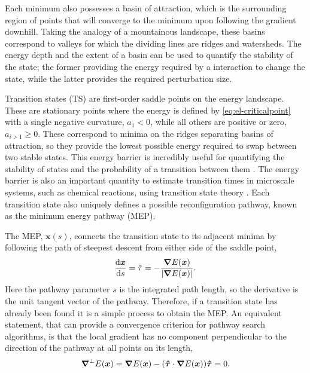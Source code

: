 Each minimum also possesses a basin of attraction, which is the surrounding region of points that will converge to the minimum upon following the gradient downhill.
Taking the analogy of a mountainous landscape, these basins correspond to valleys for which the dividing lines are ridges and watersheds.
The energy depth and the extent of a basin can be used to quantify the stability of the state; the former providing the energy required by a interaction to change the state, while the latter provides the required perturbation size.

Transition states (TS) are first-order saddle points on the energy landscape.
These are stationary points where the energy is defined by \cref{eq:el-criticalpoint} with a single negative curvature, $a_1 < 0$, while all others are positive or zero, $a_{i>1} \ge 0$.
These correspond to minima on the ridges separating basins of attraction, so they provide the lowest possible energy required to swap between two stable states.
This energy barrier is incredibly useful for quantifying the stability of states and the probability of a transition between them \cite{Mokkonen2016}.
The energy barrier is also an important quantity to estimate transition times in microscale systems, such as chemical reactions, using transition state theory \cite{Truhlar1996}.
Each transition state also uniquely defines a possible reconfiguration pathway, known as the minimum energy pathway (MEP).

The MEP, $\bm{x}(s)$, connects the transition state to its adjacent minima by following the path of steepest descent from either side of the saddle point,
\begin{equation}
  \frac{\mathrm{d} \bm{x}}{\mathrm{d} s} = \hat{\tau} = - \frac{\bm{\nabla} E(\bm{x})} {|\bm{\nabla} E(\bm{x})|}.
\end{equation}
Here the pathway parameter $s$ is the integrated path length, so the derivative is the unit tangent vector of the pathway.
Therefore, if a transition state has already been found it is a simple process to obtain the MEP.
An equivalent statement, that can provide a convergence criterion for pathway search algorithms, is that the local gradient has no component perpendicular to the direction of the pathway at all points on its length,
\begin{equation}
  \bm{\nabla}^\perp E(\bm{x}) = \bm{\nabla} E(\bm{x}) - (\bm{\hat{\tau}} \cdot \bm{\nabla} E(\bm{x})) \bm{\hat{\tau}} = 0.
  \label{eq:el-mep-convergence}
\end{equation}

